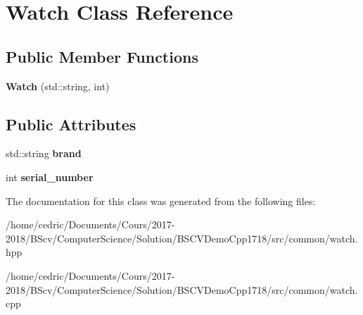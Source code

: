 \hypertarget{class_watch}{}\section{Watch Class Reference}
\label{class_watch}
\subsection*{Public Member Functions}
\begin{DoxyCompactItemize}
\item 
\mbox{\label{class_watch_a1fb755979e32c734924f7f72fae9518a}} 
{\bfseries Watch} (std\+::string, int)
\end{DoxyCompactItemize}
\subsection*{Public Attributes}
\begin{DoxyCompactItemize}
\item 
\mbox{\label{class_watch_a36065c222b72aa12ea706aa565953c47}} 
std\+::string {\bfseries brand}
\item 
\mbox{\label{class_watch_ae664fe8b12bc9f52979b81da0953d155}} 
int {\bfseries serial\+\_\+number}
\end{DoxyCompactItemize}


The documentation for this class was generated from the following files\+:\begin{DoxyCompactItemize}
\item 
/home/cedric/\+Documents/\+Cours/2017-\/2018/\+B\+Scv/\+Computer\+Science/\+Solution/\+B\+S\+C\+V\+Demo\+Cpp1718/src/common/watch.\+hpp\item 
/home/cedric/\+Documents/\+Cours/2017-\/2018/\+B\+Scv/\+Computer\+Science/\+Solution/\+B\+S\+C\+V\+Demo\+Cpp1718/src/common/watch.\+cpp\end{DoxyCompactItemize}
